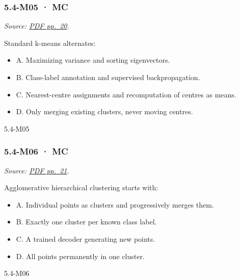 \noindent\begin{minipage}{\linewidth}

\subsubsection{5.4-M05 · MC}\label{m05-mc-15}

\emph{Source:
\href{../Lecture\%20Slides/5.4.\%20Unsupervised\%20learning.pdf\#page=20}{PDF
pp.~20}.}

Standard k-means alternates:

\begin{itemize}
\tightlist
\item
  A. Maximizing variance and sorting eigenvectors.
\item
  B. Class-label annotation and supervised backpropagation.
\item
  C. Nearest-centre assignments and recomputation of centres as means.
\item
  D. Only merging existing clusters, never moving centres.
\end{itemize}

\begin{solution}[8mm]{5.4-M05}

\end{solution}
\end{minipage}\par\medskip

\noindent\begin{minipage}{\linewidth}

\subsubsection{5.4-M06 · MC}\label{m06-mc-15}

\emph{Source:
\href{../Lecture\%20Slides/5.4.\%20Unsupervised\%20learning.pdf\#page=21}{PDF
pp.~21}.}

Agglomerative hierarchical clustering starts with:

\begin{itemize}
\tightlist
\item
  A. Individual points as clusters and progressively merges them.
\item
  B. Exactly one cluster per known class label.
\item
  C. A trained decoder generating new points.
\item
  D. All points permanently in one cluster.
\end{itemize}

\begin{solution}[8mm]{5.4-M06}

\end{solution}
\end{minipage}\par\medskip

